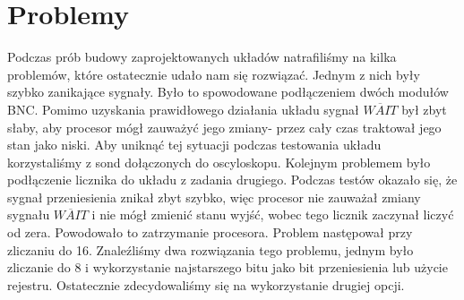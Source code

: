\documentclass[fleqn]{article}
\begin{document}
\section{Problemy}

Podczas prób budowy zaprojektowanych układów natrafiliśmy na kilka problemów, które ostatecznie udało nam się rozwiązać.
Jednym z nich były szybko zanikające sygnały. Było to spowodowane podłączeniem dwóch modułów BNC. Pomimo uzyskania prawidłowego działania układu sygnał $\overline{WAIT}$ był zbyt słaby, aby procesor mógł zauważyć jego zmiany- przez cały czas traktował jego stan jako niski. Aby uniknąć tej sytuacji podczas testowania układu korzystaliśmy z sond dołączonych do oscyloskopu.
Kolejnym problemem było podłączenie licznika do układu z zadania drugiego. Podczas testów okazało się, że sygnał przeniesienia znikał zbyt szybko, więc procesor nie zauważał zmiany sygnału $\overline{WAIT}$ i nie mógł zmienić stanu wyjść, wobec tego licznik zaczynał liczyć od zera. Powodowało to zatrzymanie procesora. Problem następował przy zliczaniu do 16. Znaleźliśmy dwa rozwiązania tego problemu, jednym było zliczanie do 8 i wykorzystanie najstarszego bitu jako bit przeniesienia lub użycie rejestru. Ostatecznie zdecydowaliśmy się na wykorzystanie drugiej opcji.
\end{document}
